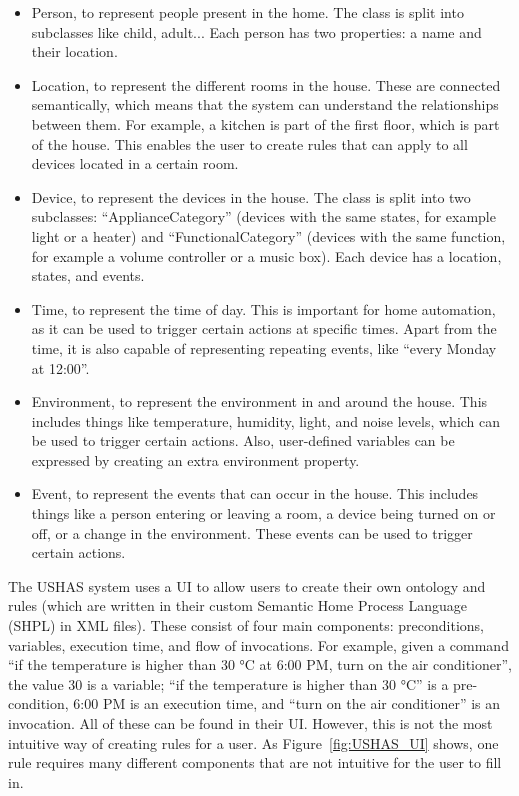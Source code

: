 \documentclass[11pt,a4paper]{report}
\begin{document}
\begin{itemize} 
    \item Person, to represent people present in the home. The class is split into subclasses like child, adult... Each person has two properties: a name and their location. 
    \item Location, to represent the different rooms in the house. These are connected semantically, which means that the system can understand the relationships between them. For example, a kitchen is part of the first floor, which is part of the house. This enables the user to create rules that can apply to all devices located in a certain room. 
    \item Device, to represent the devices in the house. The class is split into two subclasses: ``ApplianceCategory'' (devices with the same states, for example light or a heater) and ``FunctionalCategory'' (devices with the same function, for example a volume controller or a music box). Each device has a location, states, and events. 
    \item Time, to represent the time of day. This is important for home automation, as it can be used to trigger certain actions at specific times. Apart from the time, it is also capable of representing repeating events, like ``every Monday at 12:00''. 
    \item Environment, to represent the environment in and around the house. This includes things like temperature, humidity, light, and noise levels, which can be used to trigger certain actions. Also, user-defined variables can be expressed by creating an extra environment property. 
    \item Event, to represent the events that can occur in the house. This includes things like a person entering or leaving a room, a device being turned on or off, or a change in the environment. These events can be used to trigger certain actions. 
\end{itemize}

The USHAS system uses a UI to allow users to create their own ontology and rules (which are written in their custom Semantic Home Process Language (SHPL) in XML files). These consist of four main components: preconditions, variables, execution time, and flow of invocations. For example, given a command ``if the temperature is higher than 30 °C at 6:00 PM, turn on the air conditioner'', the value 30 is a variable; ``if the temperature is higher than 30 °C'' is a pre-condition, 6:00 PM is an execution time, and ``turn on the air conditioner'' is an invocation. All of these can be found in their UI. However, this is not the most intuitive way of creating rules for a user. As Figure~\ref{fig:USHAS_UI} shows, one rule requires many different components that are not intuitive for the user to fill in.
\end{document}
